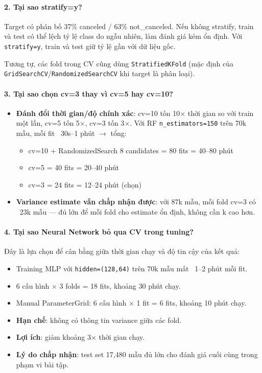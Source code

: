 \documentclass[12pt, a4paper]{article}
\begin{document}
\paragraph{2. Tại sao stratify=y?}

Target có phân bố 37\% canceled / 63\% not\_canceled. Nếu không stratify, train và test có thể lệch tỷ lệ class do ngẫu nhiên, làm đánh giá kém ổn định. Với \texttt{stratify=y}, train và test giữ tỷ lệ gần với dữ liệu gốc.

Tương tự, các fold trong CV cũng dùng \texttt{StratifiedKFold} (mặc định của \texttt{GridSearchCV}/\texttt{RandomizedSearchCV} khi target là phân loại).

\paragraph{3. Tại sao chọn cv=3 thay vì cv=5 hay cv=10?}

\begin{itemize}
    \item \textbf{Đánh đổi thời gian/độ chính xác}: cv=10 tốn 10$\times$ thời gian so với train một lần, cv=5 tốn 5$\times$, cv=3 tốn 3$\times$. Với RF \texttt{n\_estimators=150} trên 70k mẫu, mỗi fit ~30s--1 phút $\to$ tổng:
    \begin{itemize}
        \item cv=10 + RandomizedSearch 8 candidates = 80 fits = 40--80 phút
        \item cv=5 = 40 fits = 20--40 phút
        \item cv=3 = 24 fits = 12--24 phút (chọn)
    \end{itemize}
    \item \textbf{Variance estimate vẫn chấp nhận được}: với 87k mẫu, mỗi fold cv=3 có ~23k mẫu --- đủ lớn để mỗi fold cho estimate ổn định, không cần k cao hơn.

\end{itemize}

\paragraph{4. Tại sao Neural Network bỏ qua CV trong tuning?}

Đây là lựa chọn để cân bằng giữa thời gian chạy và độ tin cậy của kết quả:
\begin{itemize}
    \item Training MLP với \texttt{hidden=(128,64)} trên 70k mẫu mất ~1--2 phút mỗi fit.
    \item 6 cấu hình $\times$ 3 folds = 18 fits, khoảng 30 phút chạy.
    \item Manual ParameterGrid: 6 cấu hình $\times$ 1 fit = 6 fits, khoảng 10 phút chạy.
    \item \textbf{Hạn chế}: không có thông tin variance giữa các fold.
    \item \textbf{Lợi ích}: giảm khoảng 3$\times$ thời gian chạy.
    \item \textbf{Lý do chấp nhận}: test set 17{,}480 mẫu đủ lớn cho đánh giá cuối cùng trong phạm vi bài tập.
\end{itemize}
\end{document}
